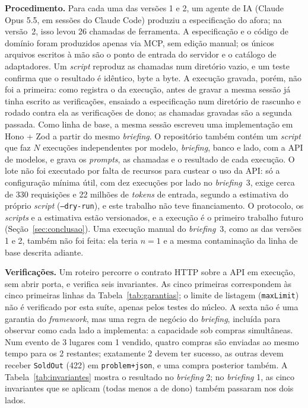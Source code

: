 \documentclass[a4paper,12pt]{article}
\newcommand{\estr}[1]{\textit{#1}}
\begin{document}
\textbf{Procedimento.} Para cada uma das versões 1 e 2, um agente de IA (Claude Opus 5.5, em sessões do Claude Code) produziu a especificação do afora; na versão~2, isso levou 26 chamadas de ferramenta. A especificação e o código de domínio foram produzidos apenas via MCP, sem edição manual; os únicos arquivos escritos à mão são o ponto de entrada do servidor e o catálogo de adaptadores. Um \estr{script} reproduz as chamadas num diretório vazio, e um teste confirma que o resultado é idêntico, byte a byte. A execução gravada, porém, não foi a primeira: como registra o  da execução, antes de gravar a mesma sessão já tinha escrito as verificações, ensaiado a especificação num diretório de rascunho e rodado contra ela as verificações de dono; as chamadas gravadas são a segunda passada. Como linha de base, a mesma sessão escreveu uma implementação em Hono + Zod a partir do mesmo \estr{briefing}. O repositório também contém um \estr{script} que faz $N$ execuções independentes por modelo, \estr{briefing}, banco e lado, com a API de modelos, e grava os \estr{prompts}, as chamadas e o resultado de cada execução. O lote não foi executado por falta de recursos para custear o uso da API: só a configuração mínima útil, com dez execuções por lado no \estr{briefing}~3, exige cerca de 330 requisições e 22 milhões de \estr{tokens} de entrada, segundo a estimativa do próprio \estr{script} (\texttt{--dry-run}), e este trabalho não teve financiamento. O protocolo, os \estr{scripts} e a estimativa estão versionados, e a execução é o primeiro trabalho futuro (Seção~\ref{sec:conclusao}). Uma execução manual do \estr{briefing}~3, como as das versões 1 e 2, também não foi feita: ela teria $n = 1$ e a mesma contaminação da linha de base descrita adiante.

\textbf{Verificações.} Um roteiro percorre o contrato HTTP sobre a API em execução, sem abrir porta, e verifica seis invariantes. As cinco primeiras correspondem às cinco primeiras linhas da Tabela~\ref{tab:garantias}; o limite de listagem (\texttt{maxLimit}) não é verificado por esta suíte, apenas pelos testes do núcleo. A sexta não é uma garantia do \estr{framework}, mas uma regra de negócio do \estr{briefing}, incluída para observar como cada lado a implementa: a capacidade sob compras simultâneas. Num evento de 3 lugares com 1 vendido, quatro compras são enviadas ao mesmo tempo para os 2 restantes; exatamente 2 devem ter sucesso, as outras devem receber \texttt{SoldOut} (422) em \texttt{problem+json}, e uma compra posterior também. A Tabela~\ref{tab:invariantes} mostra o resultado no \estr{briefing} 2; no \estr{briefing} 1, as cinco invariantes que se aplicam (todas menos a de dono) também passaram nos dois lados.
\end{document}
